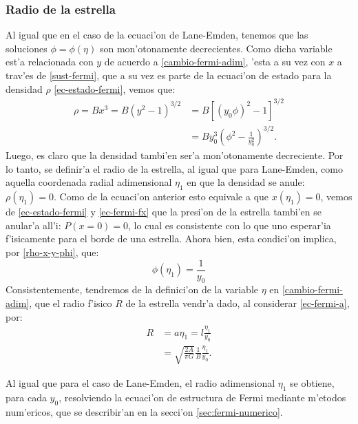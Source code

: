 \subsubsection{Radio de la estrella}
Al igual que en el caso de la ecuaci'on de Lane-Emden, tenemos que las soluciones $\phi=\phi(\eta)$ son mon'otonamente decrecientes. Como dicha variable est'a relacionada con $y$  de acuerdo a \eqref{cambio-fermi-adim}, 'esta a su vez con $x$ a trav'es de \eqref{sust-fermi}, que a su vez es parte de la ecuaci'on de estado para la densidad $\rho$ \eqref{ec-estado-fermi}, vemos que:
\begin{equation}\label{rho-x-y-phi}
\begin{split}
 \rho=Bx^3=B\left(y^2-1\right)^{3/2}&=B\left[(y_0\phi)^2-1\right]^{3/2}\\
&=By_0^3\left(\phi^2-\frac{1}{y_0^2}\right)^{3/2}.
\end{split}
\end{equation}
Luego, es claro que la densidad tambi'en ser'a mon'otonamente decreciente. Por lo tanto, se definir'a el radio de la estrella, al igual que para Lane-Emden, como aquella coordenada radial adimensional $\eta_1$ en que la densidad se anule: $\rho(\eta_1)=0$. Como de la ecuaci'on anterior esto equivale a que $x(\eta_1)=0$, vemos de \eqref{ec-estado-fermi} y \eqref{ec-fermi-fx} que la presi'on de la estrella tambi'en se anular'a all'i: $P(x=0)=0$, lo cual es consistente con lo que uno esperar'ia f'isicamente para el borde de una estrella. Ahora bien, esta condici'on implica, por \eqref{rho-x-y-phi}, que:
\begin{equation}
\phi(\eta_1)=\frac{1}{y_0}\label{ec-fermi-raices}
\end{equation}
Consistentemente, tendremos de la definici'on de la variable $\eta$ en \eqref{cambio-fermi-adim}, que el radio f'isico $R$ de la estrella vendr'a dado, al considerar \eqref{ec-fermi-a}, por:
\begin{equation}\label{ec-fermi-radio}
\boxed{
\begin{aligned}
 R&=a\eta_1=l\frac{\eta_1}{y_0}\\
&=\sqrt{\frac{2A}{\pi G}}\frac{1}{B}\frac{\eta_1}{y_0}.
\end{aligned}}
\end{equation}

Al igual que para el caso de Lane-Emden, el radio adimensional $\eta_1$ se obtiene, para cada $y_0$, resolviendo la ecuaci'on de estructura de Fermi mediante m'etodos num'ericos, que se describir'an en la secci'on \ref{sec:fermi-numerico}.

